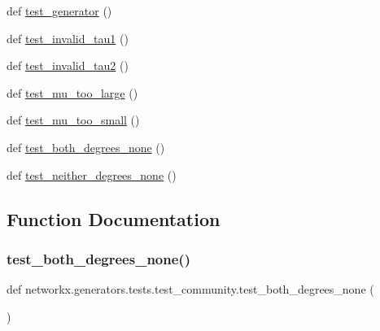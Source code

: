 \begin{DoxyCompactItemize}
def \hyperlink{namespacenetworkx_1_1generators_1_1tests_1_1test__community_a45e4be65475a1067a9a31d5c9813e110}{test\+\_\+generator} ()
\item 
def \hyperlink{namespacenetworkx_1_1generators_1_1tests_1_1test__community_a40eadd71f61ab1aae45ed8cec271932e}{test\+\_\+invalid\+\_\+tau1} ()
\item 
def \hyperlink{namespacenetworkx_1_1generators_1_1tests_1_1test__community_a958e1a4c6eb27b65515ba0135b735899}{test\+\_\+invalid\+\_\+tau2} ()
\item 
def \hyperlink{namespacenetworkx_1_1generators_1_1tests_1_1test__community_a82b7e923b648c9bfe1e409ff5879bf47}{test\+\_\+mu\+\_\+too\+\_\+large} ()
\item 
def \hyperlink{namespacenetworkx_1_1generators_1_1tests_1_1test__community_ab6a52787e15f9d3b7174d80fc2318d50}{test\+\_\+mu\+\_\+too\+\_\+small} ()
\item 
def \hyperlink{namespacenetworkx_1_1generators_1_1tests_1_1test__community_ae3c6cfa21a572978beeb3f26b931dca4}{test\+\_\+both\+\_\+degrees\+\_\+none} ()
\item 
def \hyperlink{namespacenetworkx_1_1generators_1_1tests_1_1test__community_a91694fc5a340a310af237e547026595c}{test\+\_\+neither\+\_\+degrees\+\_\+none} ()
\end{DoxyCompactItemize}


\subsection{Function Documentation}
\mbox{\label{namespacenetworkx_1_1generators_1_1tests_1_1test__community_ae3c6cfa21a572978beeb3f26b931dca4}} 
\subsubsection{\texorpdfstring{test\+\_\+both\+\_\+degrees\+\_\+none()}{test\_both\_degrees\_none()}}
{\footnotesize\ttfamily def networkx.\+generators.\+tests.\+test\+\_\+community.\+test\+\_\+both\+\_\+degrees\+\_\+none (\begin{DoxyParamCaption}{ }\end{DoxyParamCaption})}

